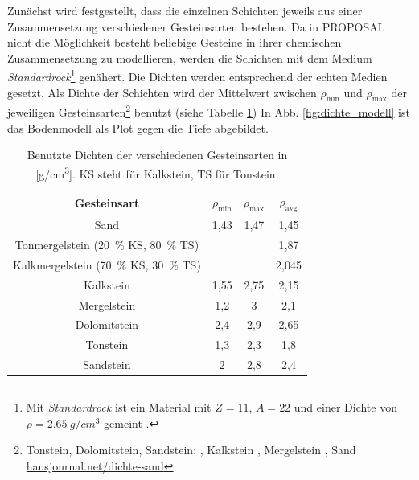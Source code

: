 Zunächst wird festgestellt, dass die einzelnen Schichten jeweils aus einer 
Zusammensetzung verschiedener Gesteinsarten bestehen.
Da in PROPOSAL nicht die Möglichkeit besteht beliebige Gesteine
in ihrer chemischen Zusammensetzung zu modellieren, werden die Schichten mit 
dem Medium 
\textit{Standardrock}\footnote{Mit \textit{Standardrock} ist ein Material mit $Z = 11$, $A = 22$ und einer Dichte
von $\rho = \SI{2.65}[]{g/cm^3}$ gemeint \cite{Chirkin2015}.}
genähert.
Die Dichten werden entsprechend der echten Medien gesetzt.
Als Dichte der Schichten wird der Mittelwert zwischen $\rho_\mathrm{min}$
und $\rho_\mathrm{max}$ der jeweiligen 
Gesteinsarten\footnote{
    Tonstein, Dolomitstein, Sandstein: \cite{JS},
    Kalkstein \cite{RC},
    Mergelstein \cite{VNK},
    Sand \url{hausjournal.net/dichte-sand}}
benutzt (siehe Tabelle \ref{tab:gesteinarten})
In Abb. \ref{fig:dichte_modell} ist das Bodenmodell als Plot gegen die Tiefe abgebildet.

\begin{table}[h]
    \caption{Benutzte Dichten der verschiedenen Gesteinsarten in [\si[]{g/cm^3}].
    KS steht für Kalkstein, TS für Tonstein.}
    \centering\begin{tabular}{c c c c}
        Gesteinsart & $\rho_\mathrm{min}$ & $\rho_\mathrm{max} $ & $\rho_\mathrm{avg}$ \\
        \toprule
        Sand & 1,43 & 1,47&1,45 \\
        Tonmergelstein (\SI[]{20}[]{\%} KS, \SI[]{80}[]{\%} TS)&&&1,87 \\
        Kalkmergelstein (\SI[]{70}[]{\%} KS, \SI[]{30}[]{\%} TS)&&&2,045 \\
        Kalkstein  & 1,55 & 2,75 & 2,15 \\
        Mergelstein & 1,2 & 3 & 2,1 \\
        Dolomitstein & 2,4 & 2,9 & 2,65 \\
        Tonstein & 1,3 & 2,3 & 1,8 \\
        Sandstein & 2 & 2,8 & 2,4 \\
    \end{tabular}
    \label{tab:gesteinarten}
\end{table} 


